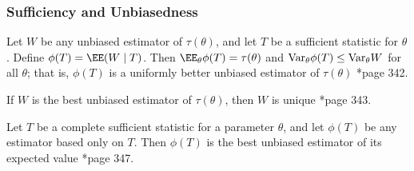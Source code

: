 \subsubsection*{Sufficiency and Unbiasedness}

\begin{thm} \label{thm: rao_bw_thrm}
    Let $W$ be any unbiased estimator of $\tau (\theta)$, and let $T$ be a sufficient statistic for $\theta$. Define $\phi (T) = \EE (W \mid T)$. Then $\EE_{\theta} \phi (T) = \tau (\theta)$ and ${\operatorname{Var}}_{\theta} \phi (T) \leq {\operatorname{Var}}_{\theta} W$ for all $\theta$; that is, $\phi (T)$ is a uniformly better unbiased estimator of $\tau (\theta)$ \cite{CasellaGeorge2001SI}*{page 342}.
\end{thm}

\begin{thm} \label{thm: best_unbiased_uniq}
    If $W$ is the best unbiased estimator of $\tau (\theta)$, then $W$ is unique \cite{CasellaGeorge2001SI}*{page 343}.
\end{thm}

\begin{thm} \label{thm: best_unbiased_uniq}
    Let $T$ be a complete sufficient statistic for a parameter $\theta$, and let $\phi (T)$ be any estimator based only on $T$. Then $\phi (T)$ is the best unbiased estimator of its expected value \cite{CasellaGeorge2001SI}*{page 347}.
\end{thm}